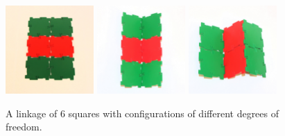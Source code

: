 

\begin{figure}
       \centering
                \includegraphics[width=0.3\textwidth]{images/G2x3_0.eps}
                \includegraphics[width=0.3\textwidth]{images/G2x3_1.eps}
                \includegraphics[width=0.3\textwidth]{images/G2x3_2.eps}


\caption{A linkage of 6 squares with configurations of different degrees of freedom.}
\label{fig:SixSq}
\end{figure}

